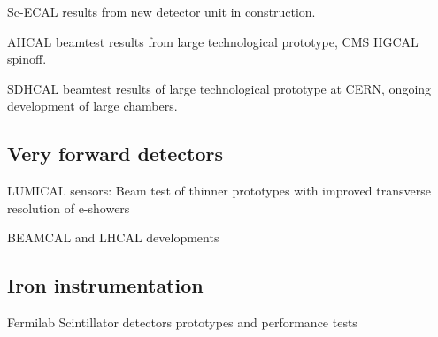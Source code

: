 Sc-ECAL results from new detector unit in construction.

AHCAL beamtest results from large technological prototype, CMS HGCAL spinoff.

SDHCAL beamtest results of large technological prototype at CERN, ongoing development of large chambers. 

\vspace{2cm}
\subsection{Very forward detectors}

LUMICAL sensors: Beam test of thinner prototypes with improved transverse resolution of e-showers

BEAMCAL and LHCAL developments

\vspace{4cm}
\subsection{Iron instrumentation}

Fermilab Scintillator detectors prototypes and performance tests

\vspace{2cm}
